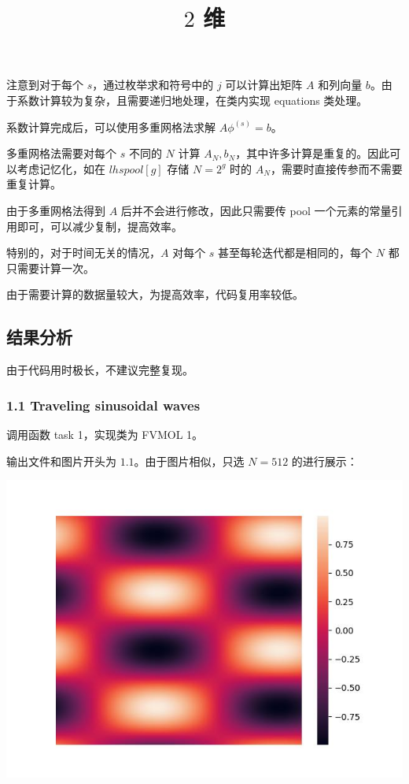 \documentclass[12pt]{ctexart}
\begin{document}
注意到对于每个 $s$，通过枚举求和符号中的 $j$ 可以计算出矩阵 $A$ 和列向量 $b$。由于系数计算较为复杂，且需要递归地处理，在类内实现 equations 类处理。

系数计算完成后，可以使用多重网格法求解 $A\phi^{(s)}=b$。

多重网格法需要对每个 $s$ 不同的 $N$ 计算 $A_N,b_N$，其中许多计算是重复的。因此可以考虑记忆化，如在 $lhs pool[g]$ 存储 $N=2^g$ 时的 $A_N$，需要时直接传参而不需要重复计算。

由于多重网格法得到 $A$ 后并不会进行修改，因此只需要传 pool 一个元素的常量引用即可，可以减少复制，提高效率。

特别的，对于时间无关的情况，$A$ 对每个 $s$ 甚至每轮迭代都是相同的，每个 $N$ 都只需要计算一次。

由于需要计算的数据量较大，为提高效率，代码复用率较低。

\subsection*{结果分析}

由于代码用时极长，不建议完整复现。

\subsubsection*{1.1 Traveling sinusoidal waves}

\title{$2$ 维}

调用函数 task 1，实现类为 FVMOL 1。

输出文件和图片开头为 $1.1$。由于图片相似，只选 $N=512$ 的进行展示：

\includegraphics[scale=0.8]{1.1(N=512).jpg}
\end{document}
